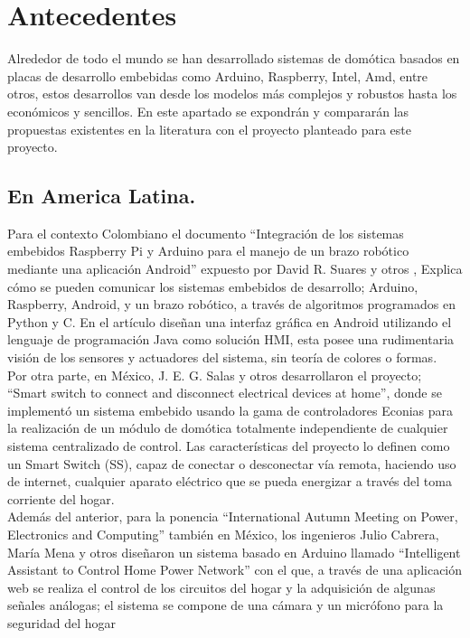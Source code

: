 \section{Antecedentes}

Alrededor de todo el mundo se han desarrollado sistemas de domótica basados en placas de desarrollo embebidas como Arduino, Raspberry, Intel, Amd, entre otros, estos desarrollos van desde los modelos más complejos y robustos hasta los económicos y sencillos. En este apartado se expondrán y compararán las propuestas existentes en la literatura con el proyecto planteado para este proyecto.

\subsection{En America Latina.}
Para el contexto Colombiano el documento “Integración de los sistemas embebidos Raspberry Pi y Arduino para el manejo de un brazo robótico mediante una aplicación Android” expuesto por David R. Suares y otros \cite{Rolando2014}, Explica cómo se pueden comunicar  los sistemas embebidos de desarrollo; Arduino, Raspberry, Android, y un brazo robótico, a través de algoritmos programados en Python y C. En el artículo diseñan una interfaz gráfica en Android utilizando el lenguaje de programación Java como solución HMI, esta posee una rudimentaria visión de los sensores y actuadores del sistema, sin teoría de colores o formas.
\vspace{0.5cm}\\
Por otra parte, en México, J. E. G. Salas y otros \cite{GiralSala2016} desarrollaron el proyecto; “Smart switch to connect and disconnect electrical devices at home”, donde se implementó un sistema embebido usando la gama de controladores Econias para la realización de un módulo de domótica totalmente independiente de cualquier sistema centralizado de control. Las características del proyecto lo definen como un  Smart Switch (SS), capaz de conectar o desconectar vía remota, haciendo uso de internet, cualquier aparato eléctrico que se pueda energizar a través del toma corriente del hogar.
\vspace{0.5cm}\\
Además del anterior, para la ponencia “International Autumn Meeting on Power, Electronics and Computing” también en México, los ingenieros Julio Cabrera, María Mena y otros \cite{Cabrera2017} diseñaron un sistema basado en Arduino llamado “Intelligent Assistant to Control Home Power Network” con el que, a través de una aplicación web se realiza el control de los circuitos del hogar y la adquisición de algunas señales análogas; el sistema se compone de una cámara y un micrófono para la seguridad del hogar
\vspace{0.5cm}\\


